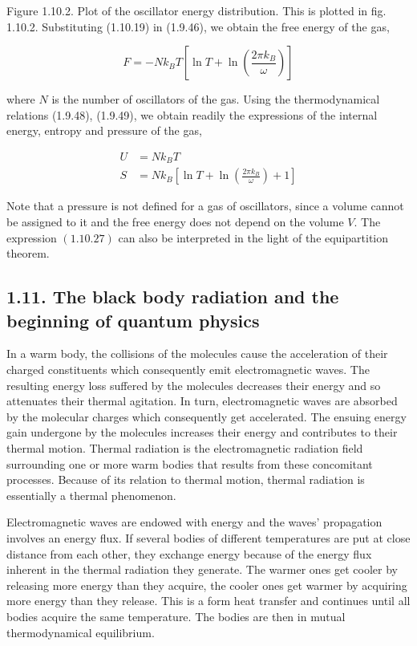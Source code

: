 \documentclass{article}
\begin{document}
Figure 1.10.2. Plot of the oscillator energy distribution.
This is plotted in fig. 1.10.2.
Substituting (1.10.19) in (1.9.46), we obtain the free energy of the gas,
 
\begin{equation*}
F=-N k_{B} T\left[\ln T+\ln \left(\frac{2 \pi k_{B}}{\omega}\right)\right] \tag{1.10.26}
\end{equation*}
 
where $N$ is the number of oscillators of the gas. Using the thermodynamical relations (1.9.48), (1.9.49), we obtain readily the expressions of the internal energy, entropy and pressure of the gas,
 
\begin{align*}
U & =N k_{B} T  \tag{1.10.27}\\
S & =N k_{B}\left[\ln T+\ln \left(\frac{2 \pi k_{B}}{\omega}\right)+1\right] \tag{1.10.28}
\end{align*}
 

Note that a pressure is not defined for a gas of oscillators, since a volume cannot be assigned to it and the free energy does not depend on the volume $V$. The expression $(1.10 .27)$ can also be interpreted in the light of the equipartition theorem. 


\subsection*{1.11. The black body radiation and the beginning of quantum physics}

In a warm body, the collisions of the molecules cause the acceleration of their charged constituents which consequently emit electromagnetic waves. The resulting energy loss suffered by the molecules decreases their energy and so attenuates their thermal agitation. In turn, electromagnetic waves are absorbed by the molecular charges which consequently get accelerated. The ensuing energy gain undergone by the molecules increases their energy and contributes to their thermal motion. Thermal radiation is the electromagnetic radiation field surrounding one or more warm bodies that results from these concomitant processes. Because of its relation to thermal motion, thermal radiation is essentially a thermal phenomenon.

Electromagnetic waves are endowed with energy and the waves' propagation involves an energy flux. If several bodies of different temperatures are put at close distance from each other, they exchange energy because of the energy flux inherent in the thermal radiation they generate. The warmer ones get cooler by releasing more energy than they acquire, the cooler ones get warmer by acquiring more energy than they release. This is a form heat transfer and continues until all bodies acquire the same temperature. The bodies are then in mutual thermodynamical equilibrium.
\end{document}
